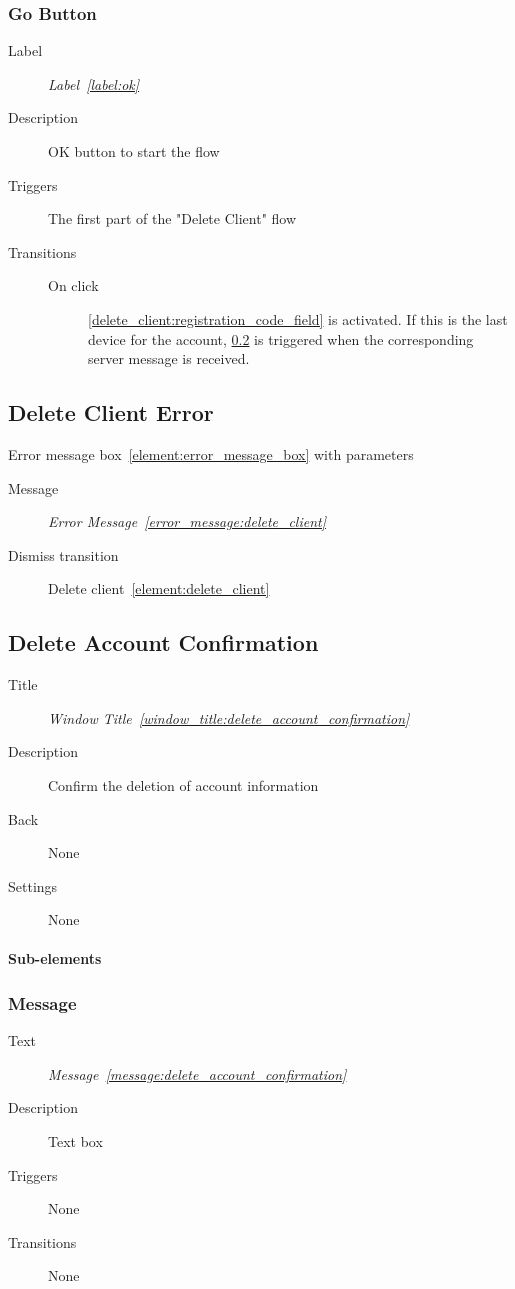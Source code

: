 \documentclass[a4paper,10pt]{article}
\newcommand{\windowTitleLabelText}{Window Title}
\newcommand{\windowTitleLabel}{window_title:}
\DeclareRobustCommand{\windowTitleRef}[1]{%
   \emph{\windowTitleLabelText~\ref{\windowTitleLabel#1}}}
\newcommand{\messageLabelText}{Message}
\newcommand{\messageLabel}{message:}
\DeclareRobustCommand{\messageTextRef}[1]{%
   \emph{\messageLabelText~\ref{\messageLabel#1}}}
\newcommand{\errorMessageLabelText}{Error Message}
\newcommand{\errorMessageLabel}{error_message:}
\DeclareRobustCommand{\errorMessageTextRef}[1]{%
   \emph{\errorMessageLabelText~\ref{\errorMessageLabel#1}}}
\newcommand{\labelLabelText}{Label}
\newcommand{\labelLabel}{label:}
\DeclareRobustCommand{\labelRef}[1]{%
   \emph{\labelLabelText~\ref{\labelLabel#1}}}
\newcommand{\elementLabel}{element:}
\DeclareRobustCommand{\element}[2]{\subsection{#1}\label{\elementLabel#2}}
\DeclareRobustCommand{\elementRef}[1]{\ref{\elementLabel#1}}
\begin{document}
\subsubsection{Go Button}
\label{delete_client:go_button}
\begin{description}
 \item[Label] \labelRef{ok}
 \item[Description] OK button to start the flow
 \item[Triggers] The first part of the "Delete Client" flow
 \item[Transitions]\mbox{}
 \begin{description}
  \item[On click] \ref{delete_client:registration_code_field} is activated. If 
this is the last device for the account, 
\elementRef{delete_account_confirmation} is triggered when the corresponding 
server message is received.
 \end{description}
\end{description}

\element{Delete Client Error}{delete_client_error}

Error message box~\elementRef{error_message_box} with parameters
\begin{description}
 \item[Message] \errorMessageTextRef{delete_client}
 \item[Dismiss transition] Delete client~\elementRef{delete_client}
\end{description}

\element{Delete Account Confirmation}{delete_account_confirmation}

\begin{description}
 \item[Title] \windowTitleRef{delete_account_confirmation}
 \item[Description] Confirm the deletion of account information
 \item[Back] None
 \item[Settings] None
\end{description}

\paragraph{Sub-elements}

\subsubsection{Message}
\begin{description}
 \item[Text] \messageTextRef{delete_account_confirmation}
 \item[Description] Text box
 \item[Triggers] None
 \item[Transitions] None
\end{description}
\end{document}
